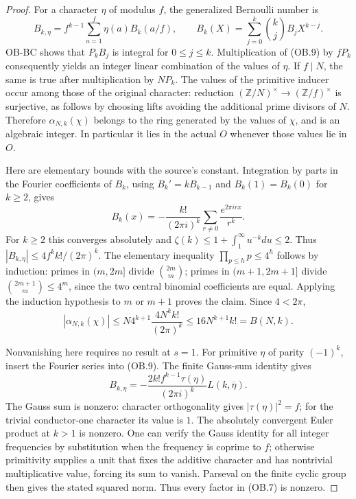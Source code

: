 \begin{proof}
For a character $\eta$ of modulus $f$, the generalized Bernoulli
number is
\[
 B_{k,\eta}=f^{k-1}\sum_{a=1}^{f}\eta(a)B_k(a/f),\qquad
 B_k(X)=\sum_{j=0}^k\binom kj B_jX^{k-j}.          \tag{OB.9}
\]
OB-BC shows that $P_kB_j$ is integral for $0\le j\le k$.
Multiplication of (OB.9) by $fP_k$ consequently yields an integer
linear combination of the values of $\eta$.  If $f\mid N$, the
same is true after multiplication by $NP_k$.  The values of the
primitive inducer occur among those of the original character:
reduction $(\mathbb Z/N)^\times\to(\mathbb Z/f)^\times$ is
surjective, as follows by choosing lifts avoiding the additional
prime divisors of $N$.  Therefore $\alpha_{N,k}(\chi)$ belongs
to the ring generated by the values of $\chi$, and is an algebraic
integer.  In particular it lies in the actual $O$ whenever those
values lie in $O$.

Here are elementary bounds with the source's constant.  Integration
by parts in the Fourier coefficients of $B_k$, using
$B_k'=kB_{k-1}$ and $B_k(1)=B_k(0)$ for $k\ge2$, gives
\[
 B_k(x)=-\frac{k!}{(2\pi i)^k}
             \sum_{r\ne0}\frac{e^{2\pi irx}}{r^k}.
\]
For $k\ge2$ this converges absolutely and
$\zeta(k)\le1+\int_1^\infty u^{-k}du\le2$.
Thus $|B_{k,\eta}|\le4f^kk!/(2\pi)^k$.
The elementary inequality $\prod_{p\le h}p\le4^h$ follows by
induction: primes in $(m,2m]$ divide $\binom{2m}{m}$; primes in
$(m+1,2m+1]$ divide $\binom{2m+1}{m}\le4^m$, since the two
central binomial coefficients are equal.  Applying the induction
hypothesis to $m$ or $m+1$ proves the claim.  Since $4<2\pi$,
\[
 |\alpha_{N,k}(\chi)|
 \le N4^{k+1}\frac{4N^kk!}{(2\pi)^k}
 \le16N^{k+1}k!=B(N,k).                          \tag{OB.10}
\]

Nonvanishing here requires no result at $s=1$.  For primitive
$\eta$ of parity $(-1)^k$, insert the Fourier series into (OB.9).
The finite Gauss-sum identity gives
\[
 B_{k,\eta}
   =-\frac{2k!f^{k-1}\tau(\eta)}{(2\pi i)^k}
                              L(k,\overline\eta).
\]
The Gauss sum is nonzero: character orthogonality gives
$|\tau(\eta)|^2=f$; for the trivial conductor-one character its
value is $1$.  The absolutely convergent Euler product at $k>1$
is nonzero.  One can verify the Gauss identity for all integer
frequencies by substitution when the frequency is coprime to $f$;
otherwise primitivity supplies a unit that fixes the additive
character and has nontrivial multiplicative value, forcing its
sum to vanish.  Parseval on the finite cyclic group then gives
the stated squared norm.  Thus every factor in (OB.7) is nonzero.


\end{proof}
